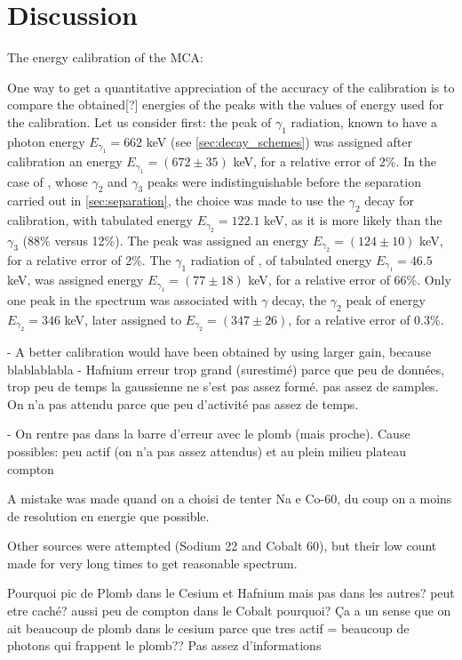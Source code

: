 \section{Discussion}
The energy calibration of the MCA:

One way to get a quantitative appreciation of the accuracy of the calibration is to compare the obtained[?] energies of the peaks with the values of energy used for the calibration.
Let us consider \cesium first: the peak of $\gamma_1$ radiation, known to have a photon energy $E_{\gamma_1} = 662$ keV (see \autoref{sec:decay_schemes}) was assigned after calibration an energy $E_{\gamma_1} = (672 \pm 35)$ keV, for a relative error of 2\%.
In the case of \cobalt, whose $\gamma_2$ and $\gamma_3$ peaks were indistinguishable before the separation carried out in \autoref{sec:separation},
the choice was made to use the $\gamma_2$ decay for calibration, with tabulated energy $E_{\gamma_2} = 122.1$ keV, as it is more likely than the $\gamma_3$ (88\% versus 12\%).
The peak was assigned an energy $E_{\gamma_2} = (124 \pm 10)$ keV, for a relative error of 2\%.
The $\gamma_1$ radiation of \lead, of tabulated energy $E_{\gamma_1} = 46.5$ keV, 
was assigned energy $E_{\gamma_1} = (77 \pm 18)$ keV, for a relative error of 66\%.
Only one peak in the \hafnium spectrum was associated with $\gamma$ decay, the $\gamma_2$ peak of energy $E_{\gamma_2} = 346$ keV, later assigned to $E_{\gamma_2} = (347 \pm 26)$, for a relative error of 0.3\%.

- A better calibration would have been obtained by using larger gain, because blablablabla
- Hafnium erreur trop grand (surestimé) parce que peu de données, trop peu de temps la gaussienne ne s'est pas assez formé. pas assez de samples.
On n'a pas attendu parce que peu d'activité pas assez de temps.

- On rentre pas dans la barre d'erreur avec le plomb (mais proche).
Cause possibles: peu actif (on n'a pas assez attendus) et au plein milieu plateau compton





A mistake was made quand on a choisi de tenter Na e Co-60, du coup on a moins de resolution en energie que possible.

Other sources were attempted (Sodium 22 and Cobalt 60), 
but their low count made for very long times to get reasonable spectrum.

Pourquoi pic de Plomb dans le Cesium et Hafnium mais pas dans les autres?
peut etre caché? aussi peu de compton dans le Cobalt pourquoi?
Ça a un sense que on ait beaucoup de plomb dans le cesium parce que tres actif = beaucoup de photons qui frappent le plomb??
Pas assez d'informations

